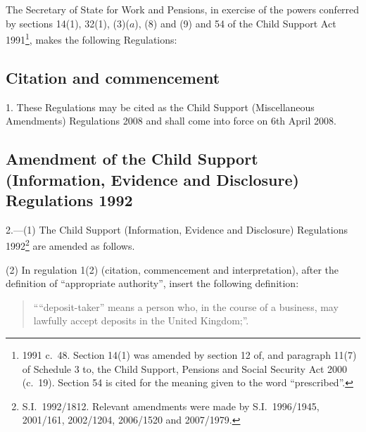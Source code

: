 \documentclass[12pt,a4paper]{article}
\title{\regstitle}
\author{S.I.\ 2008 No.\ 536}
\date{Made
27th February 2008\\
Laid before Parliament
4th March 2008\\
Coming into force
6th April 2008
}
\begin{document}
\maketitle

\noindent
The Secretary of State for Work and Pensions, in exercise of the powers conferred by sections 14(1), 32(1), (3)($a$), (8) and (9) and 54 of the Child Support Act 1991\footnote{1991 c.\ 48. Section 14(1) was amended by section 12 of, and paragraph 11(7) of Schedule 3 to, the Child Support, Pensions and Social Security Act 2000 (c.\ 19). Section 54 is cited for the meaning given to the word “prescribed”.}, makes the following Regulations: 

{\sloppy

\tableofcontents

}

\bigskip

\setcounter{secnumdepth}{-2}

\subsection[1. Citation and commencement]{Citation and commencement}

1.  These Regulations may be cited as the Child Support (Miscellaneous Amendments) Regulations 2008 and shall come into force on 6th April 2008.

\subsection[2. Amendment of the Child Support (Information, Evidence and Disclosure) Regulations 1992]{Amendment of the Child Support (Information, Evidence and Disclosure) Regulations 1992}

2.---(1)  The Child Support (Information, Evidence and Disclosure) Regulations 1992\footnote{S.I.\ 1992/1812. Relevant amendments were made by S.I.\ 1996/1945, 2001/161, 2002/1204, 2006/1520 and 2007/1979.} are amended as follows.

(2) In regulation 1(2) (citation, commencement and interpretation), after the definition of “appropriate authority”, insert the following definition:
\begin{quotation}
““deposit-taker” means a person who, in the course of a business, may lawfully accept deposits in the United Kingdom;”.
\end{quotation}
\end{document}
